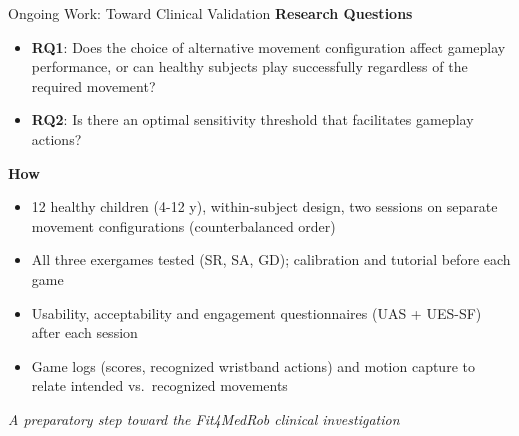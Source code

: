 \documentclass[aspectratio=169, 12pt]{beamer}
\begin{document}
\begin{frame}{Ongoing Work: Toward Clinical Validation}
	\textbf{\textcolor{gbAqua}{Research Questions}}
	
	\begin{itemize}
		\item \textbf{RQ1}: Does the choice of alternative movement configuration affect gameplay performance, or can healthy subjects play successfully regardless of the required movement?
		\item \textbf{RQ2}: Is there an optimal sensitivity threshold that facilitates gameplay actions?
	\end{itemize}
	
	\vspace{0.1cm}
	
	\textbf{\textcolor{gbAqua}{How}}
	
	\begin{itemize}
		\item 12 healthy children (4-12 y), within-subject design, two sessions on separate movement configurations (counterbalanced order)
		\item All three exergames tested (SR, SA, GD); calibration and tutorial before each game
		\item Usability, acceptability and engagement questionnaires (UAS + UES-SF) after each session
		\item Game logs (scores, recognized wristband actions) and motion capture to relate intended vs.\ recognized movements
	\end{itemize}
	
	\vspace{0.2cm}
	
	\centering
	\textit{A preparatory step toward the Fit4MedRob clinical investigation}
\end{frame}
\end{document}
